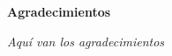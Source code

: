 
\chapter*{}
\begin{flushright}
    {\Huge\textbf{Agradecimientos}}
    \bigskip
    \bigskip

    {\itshape
        Aquí van los agradecimientos
    }
\end{flushright}
